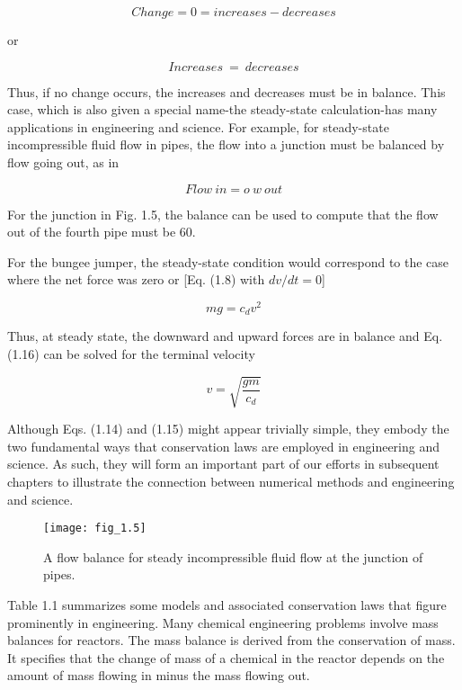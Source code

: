 \documentclass[../main.tex]{subfiles}
\begin{document}
$$ Change =  0  =  increases  −  decreases $$

or

\begin{equation}
	\tag{1.15}
	Increases \ = \ decreases
\end{equation}

Thus, if no change occurs, the increases and decreases must be in balance. This case, which
is also given a special name-the steady-state calculation-has many applications in engineering and science. For example, for steady-state incompressible fluid flow in pipes, the
flow into a junction must be balanced by flow going out, as in

\begin{equation}
	Flow \ in = o \ w \ out
\end{equation}

For the junction in Fig. 1.5, the balance can be used to compute that the flow out of the
fourth pipe must be 60.

For the bungee jumper, the steady-state condition would correspond to the case where
the net force was zero or [Eq. (1.8) with $dv/dt = 0$]

\begin{equation}
	mg =c_dv^2
\end{equation}

Thus, at steady state, the downward and upward forces are in balance and Eq. (1.16) can be
solved for the terminal velocity


$$v=\sqrt{\dfrac{gm}{c_d}}  $$

Although Eqs. (1.14) and (1.15) might appear trivially simple, they embody the two fundamental ways that conservation laws are employed in engineering and science. As such, they
will form an important part of our efforts in subsequent chapters to illustrate the connection
between numerical methods and engineering and science.


\begin{figure}[H]
	\centering
	\texttt{[image: fig\_1.5]}
   \caption{\textsf{A flow balance for steady incompressible fluid flow at the junction of pipes.}}
   \label{fig_1.5}
\end{figure}

Table 1.1 summarizes some models and associated conservation laws that figure prominently in engineering. Many chemical engineering problems involve mass balances for
reactors. The mass balance is derived from the conservation of mass. It specifies that the
change of mass of a chemical in the reactor depends on the amount of mass flowing in
minus the mass flowing out.
\end{document}

